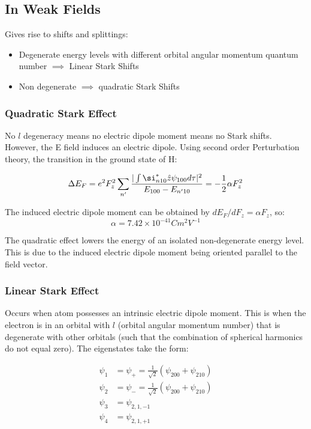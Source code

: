 \documentclass[12pt]{article}
\begin{document}
\subsection{In Weak Fields}
Gives rise to shifts and splittings:
\begin{itemize}
    \item Degenerate energy levels with different orbital angular momentum quantum number $\implies$ Linear Stark Shifts
    \item Non degenerate $\implies$ quadratic Stark Shifts
\end{itemize}

\subsubsection{Quadratic Stark Effect}
No $l$ degeneracy means no electric dipole moment means no Stark shifts. However, the E field induces an electric dipole. Using second order Perturbation theory, the transition in the ground state of H:

\[\Delta E_F = e^2 F_z^2 \sum_{n'}\frac{|\int \si^*_{n10}\hat{z}\psi_{100}d\tau|^2}{E_{100}-E_{n'10}}=-\frac12\alpha F^2_z\]

The induced electric dipole moment can be obtained by $dE_F/dF_z=\alpha F_z$, so:
\[\alpha = 7.42\times 10^{-41}Cm^2V^{-1}\]

The quadratic effect lowers the energy of an isolated non-degenerate energy level. This is due to the induced electric dipole moment being oriented parallel to the field vector.

\subsubsection{Linear Stark Effect}

Occurs when atom possesses an intrinsic electric dipole moment. This is when the electron is in an orbital with $l$ (orbital angular momentum number) that is degenerate with other orbitals (such that the combination of spherical harmonics do not equal zero). The eigenstates take the form:

\begin{align*}
    \psi_1 &= \psi_+= \frac{1}{\sqrt{2}}(\psi_{200}+\psi_{210})\\
    \psi_2 &= \psi_- =\frac{1}{\sqrt{2}}(\psi_{200}+\psi_{210})\\
    \psi_3 &= \psi_{2,1,-1}\\
    \psi_4 &= \psi_{2,1,+1}
\end{align*}
\end{document}

